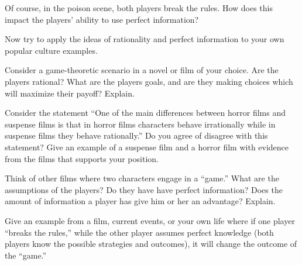 \begin{writing}
Of course, in the poison scene, both players break the rules. How does this impact the players' ability to use perfect information? 
\end{writing}



Now try to apply the ideas of rationality and perfect information to your own popular culture examples.


\begin{writing}
Consider a game-theoretic scenario in a novel or film of your choice. Are the players rational? What are the players goals, and are they making choices which will maximize their payoff? Explain.
\end{writing}

\begin{writing}
Consider the statement ``One of the main differences between horror films and suspense films is that in horror films characters behave irrationally while in suspense films they behave rationally.'' Do you agree of disagree with this statement? Give an example of a suspense film and a horror film with evidence from the films that supports your position.
\end{writing}

\begin{writing}
Think of other films where two characters engage in a ``game.'' What are the assumptions of the players? Do they have have perfect information? Does the amount of information a player has give him or her an advantage?  Explain.
\end{writing}


\begin{writing}
Give an example from a film, current events, or your own life where if one player ``breaks the rules,'' while the other player assumes perfect knowledge (both players know the possible strategies and outcomes), it will change the outcome of the ``game.''
\end{writing}






 
